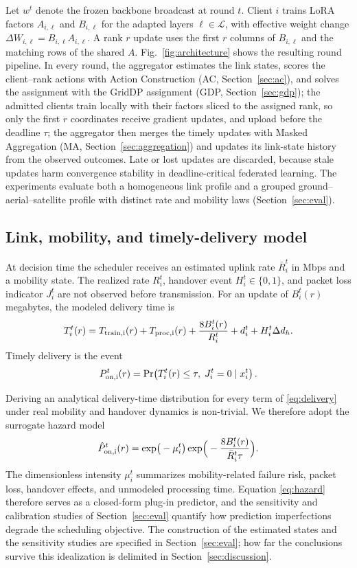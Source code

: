 \documentclass[a4paper,fleqn]{cas-dc}
\begin{document}
Let $w^t$ denote the frozen backbone broadcast at round $t$. Client $i$ trains LoRA factors $A_{i,\ell}$ and $B_{i,\ell}$ for the adapted layers $\ell\in\mathcal L$, with effective weight change $\Delta W_{i,\ell}=B_{i,\ell}A_{i,\ell}$. A rank $r$ update uses the first $r$ columns of $B_{i,\ell}$ and the matching rows of the shared $A$. Fig.~\ref{fig:architecture} shows the resulting round pipeline. In every round, the aggregator estimates the link states, scores the client--rank actions with Action Construction (AC, Section~\ref{sec:ac}), and solves the assignment with the GridDP assignment (GDP, Section~\ref{sec:gdp}); the admitted clients train locally with their factors sliced to the assigned rank, so only the first $r$ coordinates receive gradient updates, and upload before the deadline $\tau$; the aggregator then merges the timely updates with Masked Aggregation (MA, Section~\ref{sec:aggregation}) and updates its link-state history from the observed outcomes. Late or lost updates are discarded, because stale updates harm convergence stability in deadline-critical federated learning. The experiments evaluate both a homogeneous link profile and a grouped ground--aerial--satellite profile with distinct rate and mobility laws (Section~\ref{sec:eval}).

\subsection{Link, mobility, and timely-delivery model}
At decision time the scheduler receives an estimated uplink rate $\bar R_i^t$ in Mbps and a mobility state. The realized rate $R_i^t$, handover event $H_i^t\in\{0,1\}$, and packet loss indicator $J_i^t$ are not observed before transmission. For an update of $B_i^t(r)$ megabytes, the modeled delivery time is
\begin{equation}
T_i^t(r)=T_{\rm train,i}(r)+T_{\rm proc,i}(r)+\frac{8B_i^t(r)}{R_i^t}+d_i^t+H_i^t\Delta d_h.
\label{eq:delivery}
\end{equation}
Timely delivery is the event
\begin{equation}
P_{\rm on,i}^t(r)=\Pr\!\left(T_i^t(r)\le\tau,\;J_i^t=0\mid x_i^t\right).
\label{eq:pon}
\end{equation}

Deriving an analytical delivery-time distribution for every term of \eqref{eq:delivery} under real mobility and handover dynamics is non-trivial. We therefore adopt the surrogate hazard model
\begin{equation}
\hat P_{\rm on,i}^t(r)=\exp\!\big(-\mu_i^t\big)\exp\!\Big(-\frac{8B_i^t(r)}{\bar R_i^t\tau}\Big).
\label{eq:hazard}
\end{equation}
The dimensionless intensity $\mu_i^t$ summarizes mobility-related failure risk, packet loss, handover effects, and unmodeled processing time. Equation \eqref{eq:hazard} therefore serves as a closed-form plug-in predictor, and the sensitivity and calibration studies of Section~\ref{sec:eval} quantify how prediction imperfections degrade the scheduling objective. The construction of the estimated states and the sensitivity studies are specified in Section~\ref{sec:eval}; how far the conclusions survive this idealization is delimited in Section~\ref{sec:discussion}.
\end{document}
